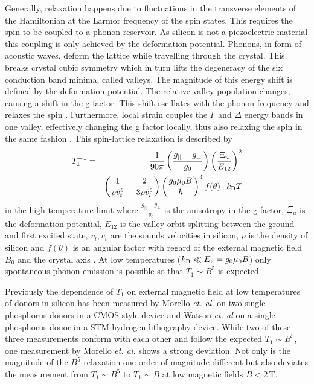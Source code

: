 Generally, relaxation happens due to fluctuations in the transverse elements of the Hamiltonian at the Larmor frequency of the spin states. This requires the spin to be coupled to a phonon reservoir.
As silicon is not a piezoelectric material this coupling is only achieved by the deformation potential. Phonons, in form of acoustic waves, deform the lattice while travelling through the crystal. This breaks crystal cubic symmetry which in turn lifts the degeneracy of the six conduction band minima, called valleys. The magnitude of this energy shift is defined by the deformation potential. The relative valley population changes, causing a shift in the g-factor. This shift oscillates with the phonon frequency and relaxes the spin \cite{Hasegawa1960}. Furthermore, local strain couples the $\Gamma$ and $\Delta$ energy bands in one valley, effectively changing the g factor locally, thus also relaxing the spin in the same fashion \cite{Roth1960}. 
This spin-lattice relaxation is described by 
\begin{eqnarray}\label{eq:fullT1}
T_1^{-1} & = & \frac{1}{90\pi}\left(\frac{g_{||}-g_\perp}{g_0}\right)\left(\frac{\Xi_u}{E_{12}}\right)^2\\
& &\left(\frac{1}{\rho \bar{v}_t^5}+\frac{2}{3\rho\bar{v}_l^5}\right)\left(\frac{g_0\mu_0B}{\hbar}\right)^4f(\theta)\cdot k_{\rm B} T
\end{eqnarray}
in the high temperature limit where $\frac{g_{||}-g_\perp}{g_0}$ is the anisotropy in the g-factor, $\Xi_u$ is the deformation potential, $E_{12}$ is the valley orbit splitting between the ground and first excited state, $v_l, v_t$ are the sounds velocities in silicon, $\rho$ is the density of silicon and $f(\theta)$ is an angular factor with regard of the external magnetic field $B_0$ and the crystal axis \cite{Wilson1961}.
At low temperatures ($k_{\rm B}\ll E_z=g_0\mu_0 B$) only spontaneous phonon emission is possible so that $T_1\sim B^5$ is expected \cite{Morello2010, Zwanenburg2013}. 

Previously the dependence of $T_1$ on external magnetic field at low temperatures of donors in silicon has been measured by Morello \textit{et. al.} \cite{Morello2010} on two single phosphorus donors in a CMOS style device and Watson \textit{et. al} \cite{Watson2015} on a single phosphorus donor in a STM hydrogen lithography device. While two of these three measurements conform with each other and follow the expected $T_1\sim B^5$, one measurement by Morello \textit{et. al.} shows a strong deviation. Not only is the magnitude of the $B^5$ relaxation one order of magnitude different but also deviates the measurement from $T_1\sim B^5$ to $T_1\sim B$ at low magnetic fields $B<2\,$T.  

